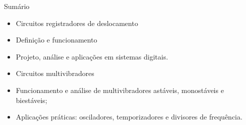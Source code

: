 
\begin{frame}{Sumário}
    \begin{itemize}
        \item Circuitos registradores de deslocamento
        \item Definição e funcionamento
        \item Projeto, análise e aplicações em sistemas digitais.
        \item Circuitos multivibradores
        \item Funcionamento e análise de multivibradores astáveis, monostáveis e biestáveis;
        \item Aplicações práticas: osciladores, temporizadores e divisores de frequência.
    \end{itemize}
\end{frame}